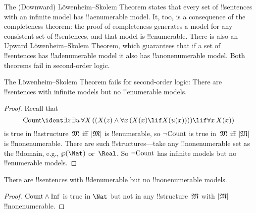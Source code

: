 \documentclass[../../../include/open-logic-section]{subfiles}
\begin{document}


\begin{explain}
The (Downward) L\"owenheim--Skolem Theorem states that every set of
!!{sentence}s with an infinite model has !!a{enumerable} model.  It,
too, is a consequence of the completeness theorem: the proof of
completeness generates a model for any consistent set of
!!{sentence}s, and that model is !!{enumerable}.  There is also an
Upward L\"owenheim--Skolem Theorem, which guarantees that if a set of
!!{sentence}s has !!a{denumerable} model it also has
!!a{nonenumerable} model.  Both theorems fail in second-order logic.
\end{explain}


\begin{thm}
 The L\"owenheim--Skolem Theorem fails for
second-order logic: There are !!{sentence}s with infinite models but
no !!{enumerable} models.
\end{thm}

\begin{proof}
Recall that 
\[
\fn{Count} \ident \lexists[z][\lexists[u][\lforall[X][((X(z) \land
      \lforall[x][(X(x) \lif X(u(x)))]) \lif \lforall[x][X(x)])]]]
\]
is true in !!a{structure}~$\Struct{M}$ iff $\Domain{M}$ is
!!{enumerable}, so $\lnot\mathrm{Count}$ is true in~$\Struct{M}$
iff $\Domain{M}$ is !!{nonenumerable}.  There are
such !!{structure}s---take any !!{nonenumerable} set as the
!!{domain}, e.g., $\Pow{\Nat}$ or~$\Real$. So $\lnot \mathrm{Count}$ 
has infinite models but no !!{enumerable} models.
\end{proof}

\begin{thm}
There are !!{sentence}s with !!{denumerable} but no
!!{nonenumerable} models.
\end{thm}

\begin{proof}
$\mathrm{Count} \land \mathrm{Inf}$ is true in $\Nat$ but not in any
  !!{structure}~$\Struct{M}$ with $\Domain{M}$ !!{nonenumerable}.
\end{proof}
\end{document}

